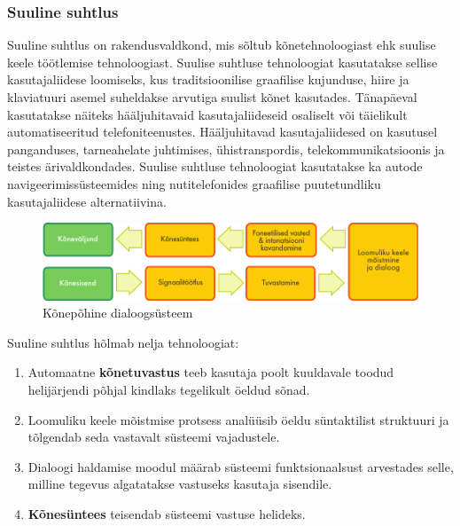 \begin{multicols}{2}
\subsubsection{Suuline suhtlus}

Suuline suhtlus on rakendusvaldkond, mis sõltub kõnetehnoloogiast ehk suulise keele töötlemise tehnoloogiast. 
Suulise suhtluse tehnoloogiat kasutatakse sellise kasutajaliidese loomiseks, kus traditsioonilise graafilise kujunduse, hiire ja klaviatuuri asemel suheldakse arvutiga suulist kõnet kasutades. 
Tänapäeval kasutatakse näiteks hääljuhitavaid kasutajaliideseid osaliselt või täielikult automatiseeritud telefoniteenustes. 
Hääljuhitavad kasutajaliidesed on kasutusel panganduses, tarneahelate juhtimises, ühistranspordis, telekommunikatsioonis ja teistes ärivaldkondades. 
Suulise suhtluse tehnoloogiat kasutatakse ka autode navigeerimissüsteemides ning nutitelefonides graafilise puutetundliku kasutajaliidese alternatiivina. 



\begin{figure}[htb]
  \center 
  \includegraphics[width=\textwidth]{../_media/estonian/simple_speech-based_dialogue_architecture}
  \caption{Kõnepõhine dialoogsüsteem}
  \label{fig:dialoguearch_ee}
\end{figure}

Suuline suhtlus hõlmab nelja tehnoloogiat:

\begin{enumerate}
\item Automaatne \textbf{kõnetuvastus} teeb kasutaja poolt kuuldavale toodud helijärjendi põhjal kindlaks tegelikult öeldud sõnad.
\item Loomuliku keele mõistmise protsess ana\-lüüsib öeldu süntaktilist struk\-tuuri ja tõlgendab seda vastavalt süsteemi vajadustele.
\item Dialoogi haldamise moodul määrab süsteemi funktsionaalsust arvestades selle, milline tegevus algatatakse vastuseks kasutaja sisendile. 
\item \textbf{Kõnesüntees} teisendab süsteemi vastuse helideks.
\end{enumerate}


\end{multicols}
